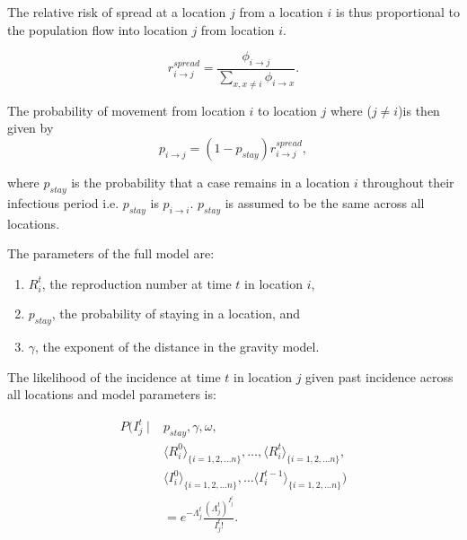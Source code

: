 \documentclass[9pt,twocolumn,twoside,lineno]{pnas-new}
\begin{document}
{The relative risk of spread at a location \(j\) from a location \(i\) is
thus proportional to the population flow into location \(j\) from
location \(i\).

\begin{equation*}
  r_{i \rightarrow j}^{spread} = \frac{\phi_{i \rightarrow
  j}}{\sum\limits_{x, x \neq i}{\phi_{i \rightarrow
  x}}}.
\end{equation*}

The probability of movement from location \(i\) to location \(j\)
where ($j \neq i$)is
then given by 
\begin{equation*} 
p_{i \rightarrow j} = (1 - p_{stay}) r_{i \rightarrow j}^{spread},
\end{equation*}

where \(p_{stay}\) is the probability that a case remains in a location
\(i\) throughout their infectious period i.e. $p_{stay}$ is $p_{i
  \rightarrow i}$. \(p_{stay}\) is assumed to be
the same across all locations.

The parameters of the full model are:

\begin{enumerate}
\def\labelenumi{\arabic{enumi}.}
\item
  \(R_{i}^{t}\), the reproduction number at time \(t\) in location
  \(i\),
\item
  \(p_{stay}\), the probability of staying in a location, and
\item
  \(\gamma\), the exponent of the distance in the gravity model.
\end{enumerate}

The likelihood of the incidence at time \(t\) in location \(j\) given
past incidence across all locations and model parameters is:

\begin{equation*}
  \begin{aligned}
P ( 
I_{j}^{t} \mid 
& p_{stay}, \gamma, \omega, \\
& {\langle R_{i}^{0} \rangle}_{\{i = 1, 2, \dots n\}}, \hdots, {\langle R_{i}^{t} \rangle}_{\{i = 1, 2, \dots n\}}, \\
& {\langle I_{i}^{0} \rangle}_{\{i = 1, 2, \dots n\}}, \hdots {\langle I_{i}^{t-1} \rangle}_{\{i = 1, 2, \dots n\}} ) \\
& =  e^{-\Lambda_{j}^{t}}  \frac{ {\left( \Lambda_{j}^{t} \right)}^{I_{j}^{t}}}{I_{j}^{t} !}.
\end{aligned}
\end{equation*}

}
\end{document}
